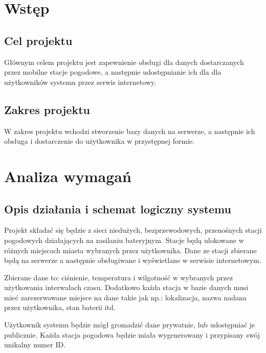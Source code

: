 \documentclass{article}
\begin{document}


\tableofcontents
\newpage%

\section{Wstęp}
\subsection{Cel projektu}
Głównym celem projektu jest zapewnienie obsługi dla  danych dostarczanych przez mobilne stacje pogodowe, a następnie udostępnianie ich dla dla użytkowników systemu przez serwis internetowy.
\subsection{Zakres projektu}
W zakres projektu wchodzi stworzenie bazy danych na serwerze, a następnie ich obsługa i dostarczenie do użytkownika w przystępnej formie.

\section{Analiza wymagań}
\subsection{Opis działania i schemat logiczny systemu}
    Projekt składać się będzie z sieci niedużych, bezprzewodowych, przenośnych stacji pogodowych działających na zasilaniu bateryjnym. Stacje będą ulokowane w różnych miejscach miasta wybranych przez użytkownika.
    Dane ze stacji zbierane będą na serwerze a następnie obsługiwane i wyświetlane w serwisie internetowym.

    Zbierane dane to: ciśnienie, temperatura i wilgotność w wybranych przez użytkowania interwałach czasu. Dodatkowo każda stacja w bazie danych musi mieć zarezerwowane miejsce na dane takie jak np.: lokalizacja, nazwa nadana przez użytkownika, stan baterii itd.
    
    Użytkownik systemu będzie mógł gromadzić dane prywatnie, lub udostępniać je publicznie.
    Każda stacja pogodowa będzie miała wygenerowany i przypisany swój unikalny numer ID.
    
\end{document}
